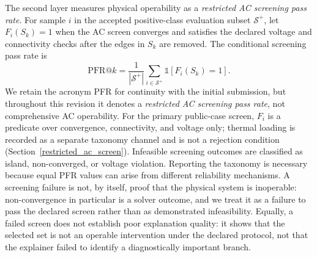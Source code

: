 The second layer measures physical operability as a \emph{restricted AC screening pass rate}. For sample $i$ in the accepted positive-class evaluation subset $\mathcal{S}^{+}$, let $F_i(S_k)=1$ when the AC screen converges and satisfies the declared voltage and connectivity checks after the edges in $S_k$ are removed. The conditional screening pass rate is
\begin{equation}
\mathrm{PFR@}k = \frac{1}{|\mathcal{S}^{+}|}\sum_{i\in\mathcal{S}^{+}}\mathbb{1}[F_i(S_k)=1].
\label{eq:pfr}
\end{equation}
We retain the acronym PFR for continuity with the initial submission, but throughout this revision it denotes a \emph{restricted AC screening pass rate}, not comprehensive AC operability. For the primary public-case screen, $F_i$ is a predicate over convergence, connectivity, and voltage only; thermal loading is recorded as a separate taxonomy channel and is not a rejection condition (Section~\ref{restricted_ac_screen}). Infeasible screening outcomes are classified as island, non-converged, or voltage violation. Reporting the taxonomy is necessary because equal PFR values can arise from different reliability mechanisms. A screening failure is not, by itself, proof that the physical system is inoperable: non-convergence in particular is a solver outcome, and we treat it as a failure to pass the declared screen rather than as demonstrated infeasibility. Equally, a failed screen does not establish poor explanation quality: it shows that the selected set is not an operable intervention under the declared protocol, not that the explainer failed to identify a diagnostically important branch.

